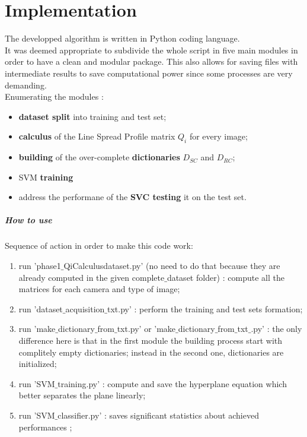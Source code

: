 \chapter{Implementation}
The developped algorithm is written in Python coding language.\\
It was deemed appropriate to subdivide the whole script in five main modules in order to have a clean and modular package. This also allows for saving files with intermediate results to save computational power since some processes are very demanding.\\
Enumerating the modules :
\begin{itemize}
    \item \textbf{dataset split} into training and test set;
    \item \textbf{calculus} of the Line Spread Profile matrix \textbf{$Q_i$} for every image;
    \item \textbf{building} of the over-complete \textbf{dictionaries} $D_{SC}$ and $D_{RC}$;
    \item SVM \textbf{training}
    \item address the performane of the \textbf{SVC testing} it on the test set.
\end{itemize}
\paragraph{How to use} Sequence of action in order to make this code work:
\begin{enumerate}
    \item run 'phase1$\_$QiCalculusdataset.py' (no need to do that because they are already computed in the given complete$\_$dataset folder) : compute all the matrices for each camera and type of image;
    \item run 'dataset$\_$acquisition$\_$txt.py' : perform the training and test sets formation;
    \item run 'make$\_$dictionary$\_$from$\_$txt.py' or 'make$\_$dictionary$\_$from$\_$txt$\_$.py' : the only difference here is that in the first module the building process start with complitely empty dictionaries; instead in the second one, dictionaries are initialized;
    \item run 'SVM$\_$training.py' : compute and save the hyperplane equation which better  separates the plane linearly;
    \item run 'SVM$\_$classifier.py' : saves significant statistics about achieved performances ;
\end{enumerate}




